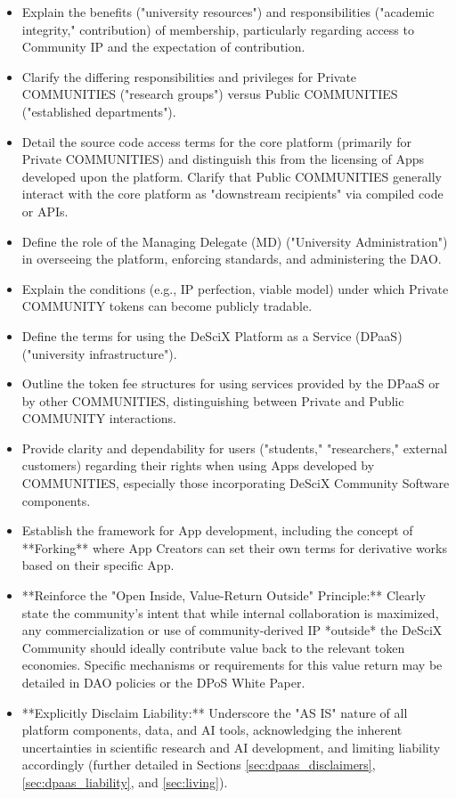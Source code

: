 \documentclass{article}
\begin{document}
\begin{itemize}
    \item Explain the benefits ("university resources") and responsibilities ("academic integrity," contribution) of membership, particularly regarding access to Community IP and the expectation of contribution.
    \item Clarify the differing responsibilities and privileges for Private COMMUNITIES ("research groups") versus Public COMMUNITIES ("established departments").
    \item Detail the source code access terms for the core platform (primarily for Private COMMUNITIES) and distinguish this from the licensing of Apps developed upon the platform. Clarify that Public COMMUNITIES generally interact with the core platform as "downstream recipients" via compiled code or APIs.
    \item Define the role of the Managing Delegate (MD) ("University Administration") in overseeing the platform, enforcing standards, and administering the DAO.
    \item Explain the conditions (e.g., IP perfection, viable model) under which Private COMMUNITY tokens can become publicly tradable.
    \item Define the terms for using the DeSciX Platform as a Service (DPaaS) ("university infrastructure").
    \item Outline the token fee structures for using services provided by the DPaaS or by other COMMUNITIES, distinguishing between Private and Public COMMUNITY interactions.
    \item Provide clarity and dependability for users ("students," "researchers," external customers) regarding their rights when using Apps developed by COMMUNITIES, especially those incorporating DeSciX Community Software components.
    \item Establish the framework for App development, including the concept of **Forking** where App Creators can set their own terms for derivative works based on their specific App.
    \item **Reinforce the "Open Inside, Value-Return Outside" Principle:** Clearly state the community's intent that while internal collaboration is maximized, any commercialization or use of community-derived IP *outside* the DeSciX Community should ideally contribute value back to the relevant token economies. Specific mechanisms or requirements for this value return may be detailed in DAO policies or the DPoS White Paper.
    \item **Explicitly Disclaim Liability:** Underscore the "AS IS" nature of all platform components, data, and AI tools, acknowledging the inherent uncertainties in scientific research and AI development, and limiting liability accordingly (further detailed in Sections \ref{sec:dpaas_disclaimers}, \ref{sec:dpaas_liability}, and \ref{sec:living}).
\end{itemize}
\end{document}

